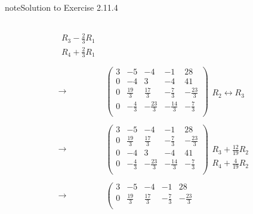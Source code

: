\documentclass[letterpaper,10pt,english]{jupyterBook}
\begin{document}
\begin{sphinxadmonition}{note}{Solution to Exercise 2.11.4}
\begin{equation*}
\begin{split}
\begin{align*}
    \begin{array}{l} \phantom{x} \\ \phantom{x} \\ R_{3} - \frac{2}{3} R_{1} \\ R_{4} + \frac{2}{3} R_{1}\end{array} \\ \\ 
    \longrightarrow 
    & \left( \begin{array}{cccc|c} 
         3 & -5 & -4 & -1 & 28 \\ 
         0 & -4 & 3 & -4 & 41 \\ 
         0 & \frac{19}{3} & \frac{17}{3} & - \frac{7}{3} & - \frac{23}{3} \\ 
         0 & - \frac{4}{3} & - \frac{23}{3} & - \frac{14}{3} & - \frac{7}{3} \\ 
    \end{array} \right) 
    \begin{array}{l} \phantom{x} \\ \phantom{x} \\ R_{2} \leftrightarrow R_{3} \\ \\ \phantom{x} \end{array} \\ \\ 
    \longrightarrow 
    & \left( \begin{array}{cccc|c} 
         3 & -5 & -4 & -1 & 28 \\ 
         0 & \frac{19}{3} & \frac{17}{3} & - \frac{7}{3} & - \frac{23}{3} \\ 
         0 & -4 & 3 & -4 & 41 \\ 
         0 & - \frac{4}{3} & - \frac{23}{3} & - \frac{14}{3} & - \frac{7}{3} \\ 
    \end{array} \right) 
    \begin{array}{l} \phantom{x} \\ \phantom{x} \\ R_{3} + \frac{12}{19} R_{2}\\ R_{4} + \frac{4}{19} R_{2}\end{array} \\ \\ 
    \longrightarrow 
    & \left( \begin{array}{cccc|c} 
         3 & -5 & -4 & -1 & 28 \\ 
         0 & \frac{19}{3} & \frac{17}{3} & - \frac{7}{3} & - \frac{23}{3} \\ 

\end{array}
\end{align*}
\end{split}
\end{equation*}
\end{sphinxadmonition}
\end{document}

